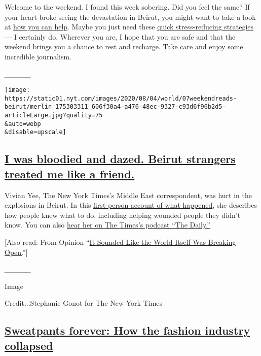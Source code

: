 Welcome to the weekend. I found this week sobering. Did you feel the
same? If your heart broke seeing the devastation in Beirut, you might
want to take a look at
\href{https://www.nytimes.com/2020/08/05/world/how-to-help-lebanon-beirut.html}{how
you can help}. Maybe you just need these
\href{https://www.nytimes.com/2020/08/06/well/mind/five-minute-coronavirus-stress-resets.html}{quick
stress-reducing strategies} --- I certainly do. Wherever you are, I hope
that you are safe and that the weekend brings you a chance to rest and
recharge. Take care and enjoy some incredible journalism.

\emph{\_\_\_\_\_}

\texttt{[image: https://static01.nyt.com/images/2020/08/04/world/07weekendreads-beirut/merlin\_175303311\_606f30a4-a476-48ec-9327-c93d6f96b2d5-articleLarge.jpg?quality=75\\\&auto=webp\\\&disable=upscale]}

\hypertarget{i-was-bloodied-and-dazed-beirut-strangers-treated-me-like-a-friend}{%
\subsection{\texorpdfstring{\href{https://www.nytimes.com/2020/08/04/world/middleeast/lebanon-explosion-beirut.html}{I
was bloodied and dazed. Beirut strangers treated me like a
friend.}}{I was bloodied and dazed. Beirut strangers treated me like a friend.}}\label{i-was-bloodied-and-dazed-beirut-strangers-treated-me-like-a-friend}}

Vivian Yee, The New York Times's Middle East correspondent, was hurt in
the explosions in Beirut. In this
\href{https://www.nytimes.com/2020/08/04/world/middleeast/lebanon-explosion-beirut.html}{first-person
account of what happened}, she describes how people knew what to do,
including helping wounded people they didn't know. You can also
\href{https://www.nytimes.com/2020/08/06/podcasts/the-daily/beirut-explosion-damage.html}{hear
her on The Times's podcast ``The Daily.''}

{[}Also read: From Opinion
``\href{https://www.nytimes.com/2020/08/05/opinion/beirut-port-explosions.html}{It
Sounded Like the World Itself Was Breaking Open.}''{]}

\emph{\_\_\_\_\_}

Image

Credit...Stephanie Gonot for The New York Times

\hypertarget{sweatpants-forever-how-the-fashion-industry-collapsed}{%
\subsection{\texorpdfstring{\href{https://www.nytimes.com/interactive/2020/08/06/magazine/fashion-sweatpants.html}{Sweatpants
forever: How the fashion industry
collapsed}}{Sweatpants forever: How the fashion industry collapsed}}\label{sweatpants-forever-how-the-fashion-industry-collapsed}}


